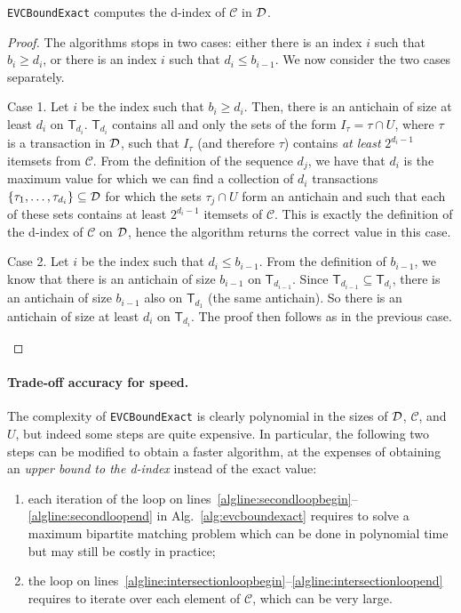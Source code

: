 \begin{lemma}\label{lem:evcboundexactcorrect}
	\texttt{EVCBoundExact} computes the d-index of $\mathcal{C}$ in ${\cal D}$.
\end{lemma}
\begin{proof}
	The algorithms stops in two cases: either there is an index $i$ such that
	$b_i\ge d_i$, or there is an index $i$ such that $d_i\le b_{i-1}$. We now
	consider the two cases separately.

	\begin{description}
		\item{Case 1.} Let $i$ be the index such that $b_i\ge d_i$. Then, there
			is an antichain of size at least $d_i$ on $\mathsf{T}_{d_i}$.
			$\mathsf{T}_{d_i}$ contains all and only the sets of the form
			$I_\tau=\tau\cap U$, where $\tau$ is a transaction in ${\cal D}$, such
			that $I_\tau$ (and therefore $\tau$) contains \emph{at least}
			$2^{d_i-1}$ itemsets from $\mathcal{C}$. From the definition of the
			sequence $d_j$, we have that $d_i$ is the maximum value for which we
			can find a collection of $d_i$ transactions
			$\{\tau_1,\dotsc,\tau_{d_i}\}\subseteq{\cal D}$ for which the sets
			$\tau_j\cap U$ form an antichain and such that each of these sets
			contains at least $2^{d_i-1}$ itemsets of $\mathcal{C}$. This is
			exactly the definition of the d-index of $\mathcal{C}$ on ${\cal D}$,
			hence the algorithm returns the correct value in this case.
		\item{Case 2.} Let $i$ be the index such that $d_i\le b_{i-1}$. From the
			definition of $b_{i-1}$, we know that there is an antichain of size
			$b_{i-1}$ on $\mathsf{T}_{d_{i-1}}$. Since
			$\mathsf{T}_{d_{i-1}}\subseteq \mathsf{T}_{d_i}$, there is an
			antichain of size $b_{i-1}$ also on $\mathsf{T}_{d_1}$ (the same
			antichain). So there is an antichain of size at least $d_i$ on
			$\mathsf{T}_{d_i}$. The proof then follows as in the previous case.
	\end{description}
\end{proof}

\paragraph{Trade-off accuracy for speed.} The complexity of
\texttt{EVCBoundExact} is clearly polynomial in the sizes of ${\cal D}$,
$\mathcal{C}$, and $U$, but indeed some steps are quite expensive. In
particular, the following two steps can be modified to obtain a faster algorithm, at the expenses of
obtaining an \emph{upper bound to the d-index} instead of the exact value:
\begin{enumerate}
	\item each iteration of the loop on
		lines~\ref{algline:secondloopbegin}--\ref{algline:secondloopend} in
		Alg.~\ref{alg:evcboundexact} requires to solve a maximum bipartite
		matching problem which can be done in polynomial time but may still be
		costly in practice;
	\item the loop on
		lines~\ref{algline:intersectionloopbegin}--\ref{algline:intersectionloopend}
		requires to iterate over each element of $\mathcal{C}$, which can be
		very large.
\end{enumerate}

